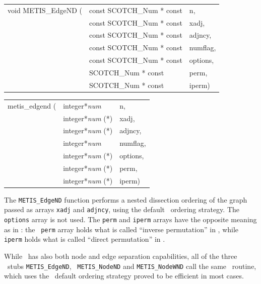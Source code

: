 \begin{itemize}
\progsyn

{\tt\begin{tabular}{l@{}ll}
void METIS\_EdgeND ( & const SCOTCH\_Num * const & n, \\
                     & const SCOTCH\_Num * const & xadj, \\
                     & const SCOTCH\_Num * const & adjncy, \\
                     & const SCOTCH\_Num * const & numflag, \\
                     & const SCOTCH\_Num * const & options, \\
                     & SCOTCH\_Num * const       & perm, \\
                     & SCOTCH\_Num * const       & iperm)
\end{tabular}}

{\tt\begin{tabular}{l@{}ll}
metis\_edgend ( & integer*{\it num}     & n, \\
                & integer*{\it num} (*) & xadj, \\
                & integer*{\it num} (*) & adjncy, \\
                & integer*{\it num}     & numflag, \\
                & integer*{\it num} (*) & options, \\
                & integer*{\it num} (*) & perm, \\
                & integer*{\it num} (*) & iperm)
\end{tabular}}

\progdes

The {\tt METIS\_EdgeND} function performs a nested dissection ordering
of the graph passed as arrays {\tt xadj} and {\tt adjncy}, using
the default \scotch\ ordering strategy. The {\tt options} array is not
used. The {\tt perm} and {\tt iperm} arrays have the opposite meaning
as in \scotch: the \metis\ {\tt perm} array holds what is called
``inverse permutation'' in \scotch, while {\tt iperm} holds what is
called ``direct permutation'' in \scotch.

While \scotch\ has also both node and edge separation capabilities,
all of the three \metis\ stubs {\tt METIS\_\lbo EdgeND}, {\tt
METIS\_\lbo NodeND} and {\tt METIS\_\lbo NodeWND} call the same
\scotch\ routine, which uses the \scotch\ default ordering strategy
proved to be efficient in most cases.
\end{itemize}

